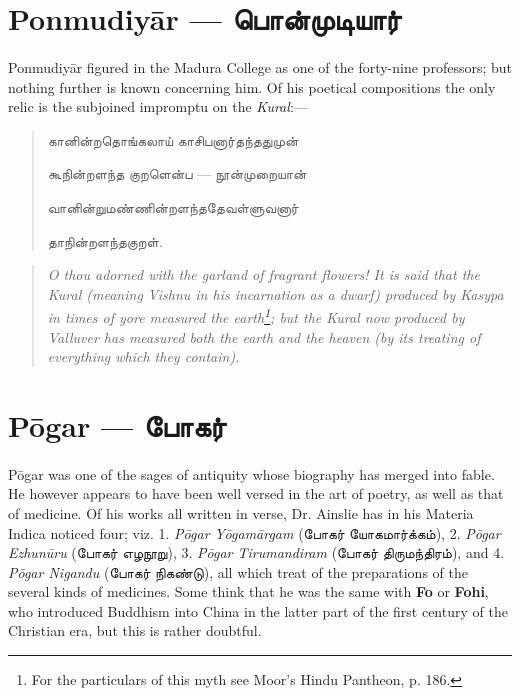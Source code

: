 \documentclass{article}
\newcommand{\TamilText}[1]{\texttamil{#1}}
\newcommand{\TamilBold}[1]{\texttamil{\textbf{#1}}}
\newcommand{\tam}[1]{\TamilText{#1}}
\newcommand{\tambold}[1]{\TamilBold{#1}}
\begin{document}
\section{Ponmudiy\={a}r --- \tambold{பொன்முடியார்}}
\paragraph{}
Ponmudiy\={a}r figured in the Madura College as one of the forty-nine professors; but nothing further is known concerning him. Of his poetical compositions the only relic is the subjoined impromptu on the \emph{Kural}:---
\begin{quotation}\small
\tam{கானின்றதொங்கலாய்‌ காசிபனார்தந்ததுமுன்‌}

\tam{கூநின்றளந்த குறளென்ப} --- \tam{நூன்‌முறையான்‌}

\tam{வானின்றுமண்ணின்றளந்ததேவள்ளுவனார்‌}

\tam{தாநின்றளந்தகுறள்‌}.
\end{quotation}
\begin{quotation}\small
\emph{O thou adorned with the garland of fragrant flowers! It is said that the Kural (meaning Vishnu in his incarnation as a dwarf) produced by Kasypa in times of yore measured the earth\footnote{For the particulars of this myth see Moor's Hindu Pantheon, p. 186.}; but the Kural now produced by Valluver has measured both the earth and the heaven (by its treating of everything which they contain).}
\end{quotation}

\section{P\={o}gar --- \tambold{போகர்}}
\paragraph{}
P\={o}gar was one of the sages of antiquity whose biography has merged into fable. He however appears to have been well versed in the art of poetry, as well as that of medicine. Of his works all written in verse, Dr. Ainslie has in his Materia Indica noticed four; viz. 1. \emph{P\={o}gar Y\={o}gam\={a}rgam} (\tam{போகர் யோகமார்க்கம்}), 2. \emph{P\={o}gar Ezhun\={u}ru} (\tam{போகர் எழநூறு}), 3. \emph{P\={o}gar Tirumandiram} (\tam{போகர் திருமந்திரம்}), and 4. \emph{P\={o}gar Nigandu} (\tam{போகர் நிகண்டு}), all which treat of the preparations of the several kinds of medicines. Some think that he was the same with \textbf{Fo} or \textbf{Fohi}, who introduced Buddhism into China in the latter part of the first century of the Christian era, but this is rather doubtful.
\end{document}
